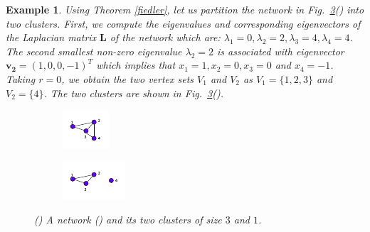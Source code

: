 \documentclass[10pt,a4paper]{article}
\newtheorem{exa}{Example}
\begin{document}
\begin{exa} Using Theorem \ref{fiedler}, let us partition the network in Fig.~\ref{clusters}() into two clusters. First, we compute the eigenvalues and corresponding eigenvectors of the Laplacian matrix $\mathbf{L}$ of the network which are: $\lambda_1=0,\lambda_2=2,\lambda_3=4,\lambda_4=4$. The second smallest non-zero eigenvalue $\lambda_2=2$ is associated with eigenvector $ \mathbf{v_2}=(1,0,0,-1)^T$ which implies that $x_1 =1, x_2 = 0, x_3=0$ and $x_4=-1$. Taking $r=0$, we obtain the two vertex sets $V_1$ and $V_2$ as $V_1 = \{1,2,3 \}$ and $V_2 =\{4 \}$. The two clusters are shown in Fig.~\ref{clusters}().
	
	\begin{figure}[!h]
		\centering
		\begin{subfigure}[b]{0.21\textwidth}
			\includegraphics[width=\textwidth]{images/cluster-graph.pdf}
			\caption{}
			\label{whole-graph}
		\end{subfigure}
		\begin{subfigure}[b]{0.28\textwidth}
			\includegraphics[width=\textwidth]{images/partitions-graph.pdf}
			\caption{}
			\label{cluster-graph}
		\end{subfigure} 
		\caption{() A network () and its two clusters of size $3$ and $1$.} \label{clusters}
	\end{figure}
\end{exa}
\end{document}
